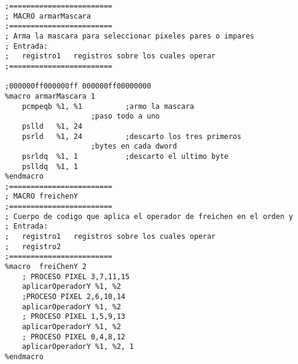\documentclass[11pt]{article}
\begin{document}
\begin{enumerate}
\begin{lstlisting}[frame=single]
;========================
; MACRO armarMascara
;========================
; Arma la mascara para seleccionar pixeles pares o impares
; Entrada:
;	registro1	registros sobre los cuales operar 
;========================

;000000ff000000ff 000000ff00000000
%macro armarMascara 1
	pcmpeqb	%1, %1			;armo la mascara
					;paso todo a uno
	pslld	%1, 24
	psrld	%1, 24			;descarto los tres primeros
					;bytes en cada dword
	psrldq	%1, 1			;descarto el ultimo byte
	pslldq	%1, 1
%endmacro
;========================
; MACRO freichenY
;========================
; Cuerpo de codigo que aplica el operador de freichen en el orden y
; Entrada:
;	registro1	registros sobre los cuales operar 
;	registro2
;========================
%macro	freiChenY 2
	; PROCESO PIXEL 3,7,11,15
	aplicarOperadorY %1, %2
	;PROCESO PIXEL 2,6,10,14
	aplicarOperadorY %1, %2
	; PROCESO PIXEL 1,5,9,13
	aplicarOperadorY %1, %2
	; PROCESO PIXEL 0,4,8,12
	aplicarOperadorY %1, %2, 1
%endmacro

\end{lstlisting}
\end{enumerate}


\newpage
\end{document}
